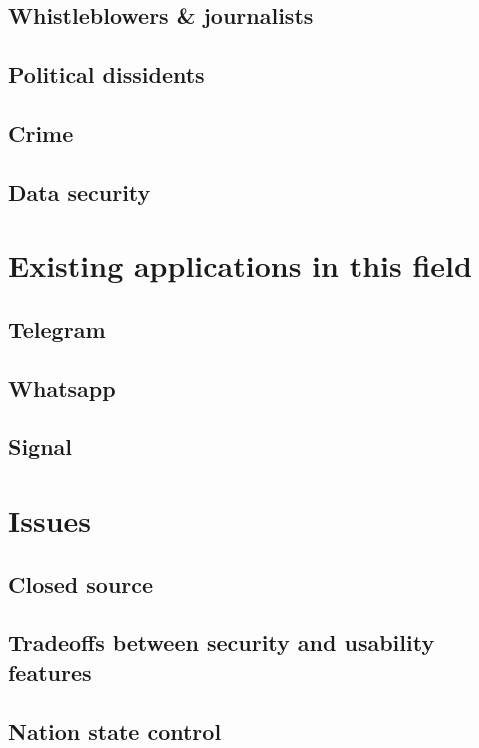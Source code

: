 \documentclass{mproj}
\begin{document}
\subsection{Whistleblowers \& journalists}

\subsection{Political dissidents}

\subsection{Crime}

\subsection{Data security}

\section{Existing applications in this field}

\subsection{Telegram}

\subsection{Whatsapp}

\subsection{Signal}

\section{Issues}

\subsection{Closed source}

\subsection{Tradeoffs between security and usability features}

\subsection{Nation state control}
\end{document}
